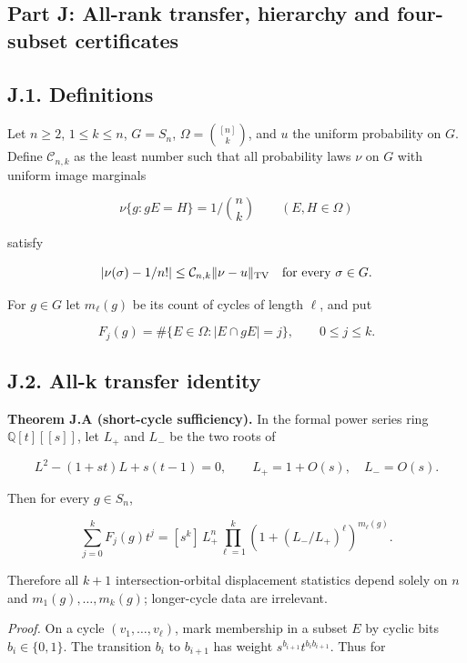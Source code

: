 \documentclass[
  11pt,
]{article}
\begin{document}
\subsection{Part J: All-rank transfer, hierarchy and four-subset
certificates}\label{part-j-all-rank-transfer-hierarchy-and-four-subset-certificates}

\subsection{J.1. Definitions}\label{j.1.-definitions}

Let \(n\ge2\), \(1\le k\le n\), \(G=S_n\), \(\Omega=\binom{[n]}k\), and
\(u\) the uniform probability on \(G\). Define \(\mathcal C_{n,k}\) as
the least number such that all probability laws \(\nu\) on \(G\) with
uniform image marginals

\[
\nu\{g:gE=H\}=1/\binom nk\qquad(E,H\in\Omega)
\]

satisfy

\[
|\nu(\sigma)-1/n!|\le\mathcal C_{n,k}\|\nu-u\|_{\rm TV}
\quad\text{for every }\sigma\in G.
\]

For \(g\in G\) let \(m_\ell(g)\) be its count of cycles of length
\(\ell\), and put

\[
F_j(g)=\#\{E\in\Omega:|E\cap gE|=j\},\qquad 0\le j\le k.
\]

\subsection{J.2. All-k transfer
identity}\label{j.2.-all-k-transfer-identity}

\textbf{Theorem J.A (short-cycle sufficiency).} In the formal power
series ring \(\mathbb Q[t][[s]]\), let \(L_+\) and \(L_-\) be the two
roots of

\[
L^2-(1+st)L+s(t-1)=0,\qquad
L_+=1+O(s),\quad L_-=O(s).
\]

Then for every \(g\in S_n\),

\[
\boxed{\displaystyle
\sum_{j=0}^k F_j(g)t^j
=[s^k]\,L_+^n\prod_{\ell=1}^k
\left(1+(L_-/L_+)^\ell\right)^{m_\ell(g)}.}
\tag{J.1}
\]

Therefore all \(k+1\) intersection-orbital displacement statistics
depend solely on \(n\) and \(m_1(g),\ldots,m_k(g)\); longer-cycle data
are irrelevant.

\emph{Proof.} On a cycle \((v_1,\ldots,v_\ell)\), mark membership in a
subset \(E\) by cyclic bits \(b_i\in\{0,1\}\). The transition \(b_i\) to
\(b_{i+1}\) has weight \(s^{b_{i+1}}t^{b_ib_{i+1}}\). Thus for
\end{document}

